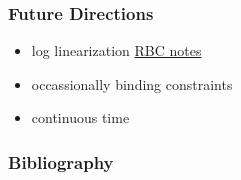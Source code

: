 \documentclass{beamer}
\begin{document}
 \begin{frame}
   \frametitle{Future Directions}
   \begin{itemize}
 \item log linearization 
 \href{http://web.mit.edu/14.452/www/pdf/rbc.pdf}{RBC notes}
\item occassionally binding constraints
\item continuous time

\end{itemize}
 \end{frame}


\begin{frame}
  \frametitle{Bibliography}
  


\end{frame}



\end{document}
